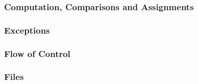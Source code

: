 \subsubsection{Computation, Comparisons and Assignments}

\subsubsection{Exceptions}

\subsubsection{Flow of Control}

\subsubsection{Files}




